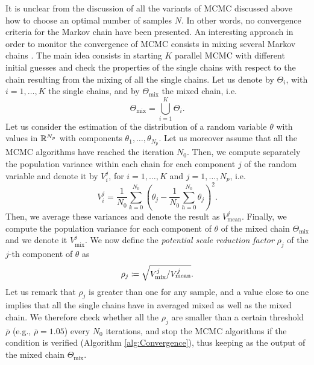 It is unclear from the discussion of all the variants of MCMC discussed above how to choose an optimal number of samples $N$. In other words, no convergence criteria for the Markov chain have been presented. An interesting approach in order to monitor the convergence of MCMC consists in mixing several Markov chains \cite{GeS11}. The main idea consists in starting $K$ parallel MCMC with different initial guesses and check the properties of the single chains with respect to the chain resulting from the mixing of all the single chains. Let us denote by $\Theta_i$, with $i = 1, \ldots, K$ the single chains, and by $\Theta_{\mathrm{mix}}$ the mixed chain, i.e.
\begin{equation}
	\Theta_{\mathrm{mix}} = \bigcup_{i = 1}^{K} \Theta_i.
\end{equation}
Let us consider the estimation of the distribution of a random variable $\theta$ with values in $\mathbb{R}^{N_p}$ with components $\theta_1, \ldots, \theta_{N_p}$. Let us moreover assume that all the MCMC algorithms have reached the iteration $N_0$. Then, we compute separately the population variance within each chain for each component $j$ of the random variable and denote it by $V_i^j$, for $i = 1, \ldots, K$ and $j = 1, \ldots, N_p$, i.e.
\begin{equation}
	V_i^j = \frac{1}{N_0} \sum_{k=0}^{N_0} \left(\theta_j - \frac{1}{N_0}\sum_{h = 0}^{N_0} \theta_j \right)^2.
\end{equation}
Then, we average these variances and denote the result as $V^j_{\mathrm{mean}}$. Finally, we compute the population variance for each component of $\theta$ of the mixed chain $\Theta_{\mathrm{mix}}$ and we denote it $V^j_{\mathrm{mix}}$. We now define the \textit{potential scale reduction factor} $\rho_j$ of the $j$-th component of $\theta$ as \cite{GeS11}
\begin{equation}\label{eq:RhoMCMC}
	\rho_j \coloneqq \sqrt{ V^j_{\mathrm{mix}} / V_{\mathrm{mean}}^j }.
\end{equation}
Let us remark that $\rho_j$ is greater than one for any sample, and a value close to one implies that all the single chains have in averaged mixed as well as the mixed chain. We therefore check whether all the $\rho_j$ are smaller than a certain threshold $\bar \rho$ (e.g., $\bar \rho = 1.05$) every $N_0$ iterations, and stop the MCMC algorithms if the condition is verified (Algorithm \ref{alg:Convergence}), thus keeping as the output of the mixed chain $\Theta_{\mathrm{mix}}$.


